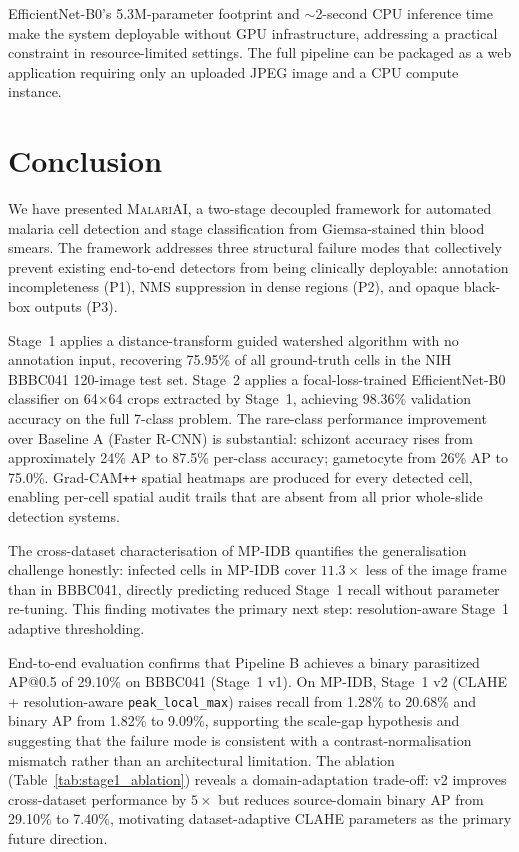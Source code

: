 \documentclass[review,12pt]{elsarticle}
\newcommand{\malariai}{\textsc{MalariAI}}
\begin{document}
EfficientNet-B0's 5.3M-parameter footprint and $\sim$2-second CPU inference
time make the system deployable without GPU infrastructure, addressing
a practical constraint in resource-limited settings. The full pipeline can
be packaged as a web application requiring only an uploaded JPEG image
and a CPU compute instance.

\section{Conclusion}
\label{sec:conclusion}

We have presented \malariai{}, a two-stage decoupled framework for automated
malaria cell detection and stage classification from Giemsa-stained thin
blood smears. The framework addresses three structural failure modes that
collectively prevent existing end-to-end detectors from being clinically
deployable: annotation incompleteness (P1), NMS suppression in dense regions
(P2), and opaque black-box outputs (P3).

Stage~1 applies a distance-transform guided watershed algorithm with no
annotation input, recovering 75.95\% of all ground-truth cells in the
NIH BBBC041 120-image test set. Stage~2 applies a focal-loss-trained
EfficientNet-B0 classifier on 64$\times$64 crops extracted by Stage~1,
achieving 98.36\% validation accuracy on the full 7-class problem. The
rare-class performance improvement over Baseline A (Faster R-CNN) is
substantial: schizont accuracy rises from approximately 24\% AP to 87.5\%
per-class accuracy; gametocyte from 26\% AP to 75.0\%. Grad-CAM\texttt{++}
spatial heatmaps are produced for every detected cell, enabling per-cell
spatial audit trails that are absent from all prior whole-slide detection
systems.

The cross-dataset characterisation of MP-IDB quantifies the generalisation
challenge honestly: infected cells in MP-IDB cover $11.3\times$ less of
the image frame than in BBBC041, directly predicting reduced Stage~1 recall
without parameter re-tuning. This finding motivates the primary next step:
resolution-aware Stage~1 adaptive thresholding.

End-to-end evaluation confirms that Pipeline B achieves a binary
parasitized AP@0.5 of 29.10\% on BBBC041 (Stage~1 v1). On MP-IDB, Stage~1
v2 (CLAHE + resolution-aware \texttt{peak\_local\_max}) raises recall from
1.28\% to 20.68\% and binary AP from 1.82\% to 9.09\%, supporting the
scale-gap hypothesis and suggesting that the failure mode is
consistent with a contrast-normalisation mismatch rather than an architectural limitation.
The ablation (Table~\ref{tab:stage1_ablation}) reveals a domain-adaptation
trade-off: v2 improves cross-dataset performance by $5\times$ but reduces
source-domain binary AP from 29.10\% to 7.40\%, motivating
dataset-adaptive CLAHE parameters as the primary future direction.
\end{document}
